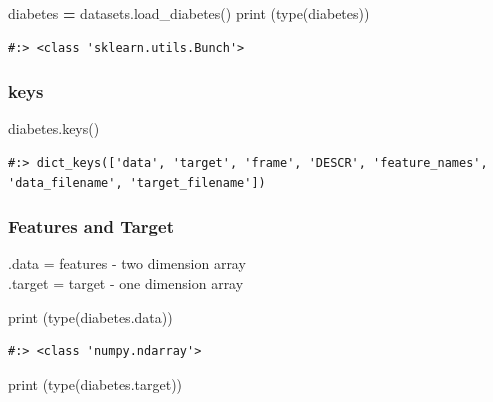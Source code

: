 \documentclass[
]{book}
\newenvironment{Shaded}{\begin{snugshade}}{\end{snugshade}}
\newcommand{\BuiltInTok}[1]{#1}
\newcommand{\NormalTok}[1]{#1}
\newcommand{\OperatorTok}[1]{\textcolor[rgb]{0.43,0.43,0.43}{\textbf{#1}}}
\begin{document}
\begin{Shaded}
\begin{Highlighting}[]
\NormalTok{diabetes }\OperatorTok{=}\NormalTok{ datasets.load_diabetes()}
\BuiltInTok{print}\NormalTok{ (}\BuiltInTok{type}\NormalTok{(diabetes))}
\end{Highlighting}
\end{Shaded}

\begin{verbatim}
#:> <class 'sklearn.utils.Bunch'>
\end{verbatim}

\hypertarget{keys}{%
\subsubsection{keys}\label{keys}}

\begin{Shaded}
\begin{Highlighting}[]
\NormalTok{diabetes.keys()}
\end{Highlighting}
\end{Shaded}

\begin{verbatim}
#:> dict_keys(['data', 'target', 'frame', 'DESCR', 'feature_names', 'data_filename', 'target_filename'])
\end{verbatim}

\hypertarget{features-and-target}{%
\subsubsection{Features and Target}\label{features-and-target}}

.data = features - two dimension array\\
.target = target - one dimension array

\begin{Shaded}
\begin{Highlighting}[]
\BuiltInTok{print}\NormalTok{ (}\BuiltInTok{type}\NormalTok{(diabetes.data))}
\end{Highlighting}
\end{Shaded}

\begin{verbatim}
#:> <class 'numpy.ndarray'>
\end{verbatim}

\begin{Shaded}
\begin{Highlighting}[]
\BuiltInTok{print}\NormalTok{ (}\BuiltInTok{type}\NormalTok{(diabetes.target))}
\end{Highlighting}
\end{Shaded}
\end{document}
